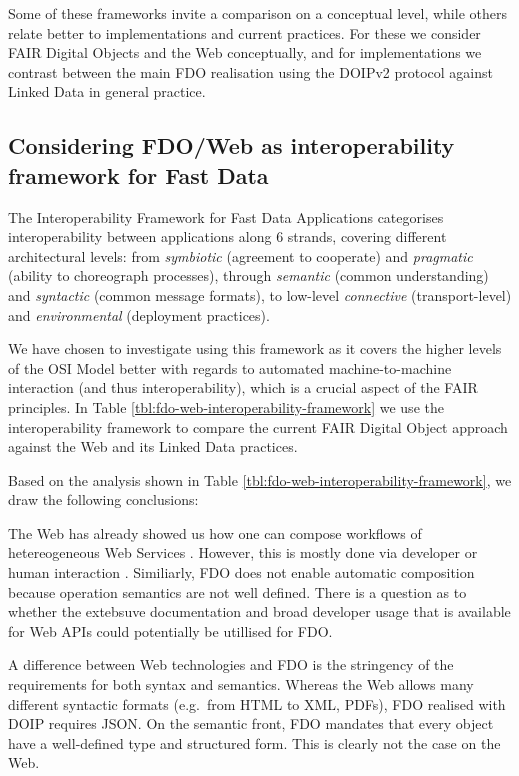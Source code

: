 \documentclass[fleqn,10pt,NOlineno]{wlpeerjlua}
\begin{document}
Some of these frameworks invite a comparison on a conceptual level, while others relate better to implementations and current practices. For these we consider FAIR Digital Objects and the Web conceptually, and for implementations we contrast between the main FDO realisation using the DOIPv2 protocol \autocite{foundationDigitalObjectInterface} against Linked Data in general practice.


\subsection*{Considering FDO/Web as interoperability framework for Fast Data}\label{sec:interoperability-compare}

The Interoperability Framework for Fast Data Applications \autocite{delgadoInteroperabilityFrameworkDistributed2016a} categorises interoperability between applications along 6 strands, covering different architectural levels: from \emph{symbiotic} (agreement to cooperate) and \emph{pragmatic} (ability to choreograph processes), through \emph{semantic} (common understanding) and \emph{syntactic} (common message formats), to low-level \emph{connective} (transport-level) and \emph{environmental} (deployment practices).

We have chosen to investigate using this framework as it covers the higher levels of the OSI Model \autocite{stallingsHandbookComputercommunicationsStandards1990} better with regards to automated machine-to-machine interaction (and thus interoperability), which is a crucial aspect of the FAIR principles. In Table \vref{tbl:fdo-web-interoperability-framework} we use the interoperability framework to compare the current FAIR Digital Object approach against the Web and its Linked Data practices.

Based on the analysis shown in Table \ref{tbl:fdo-web-interoperability-framework}, we draw the following conclusions:

The Web has already showed us how one can compose workflows of hetereogeneous Web Services \autocite{wolstencroftTavernaWorkflowSuite2013d}. However, this is mostly done via developer or human interaction \autocite{lamprechtPerspectivesAutomatedComposition2021b}. Similiarly, FDO does not enable automatic composition because operation semantics are not well defined. There is a question as to whether the extebsuve documentation and broad developer usage that is available for Web APIs could potentially be utillised for FDO.

A difference between Web technologies and FDO is the stringency of the requirements for both syntax and semantics. Whereas the Web allows many different syntactic formats (e.g.~from HTML to XML, PDFs), FDO realised with DOIP requires JSON. On the semantic front, FDO mandates that every object have a well-defined type and structured form. This is clearly not the case on the Web.
\end{document}
